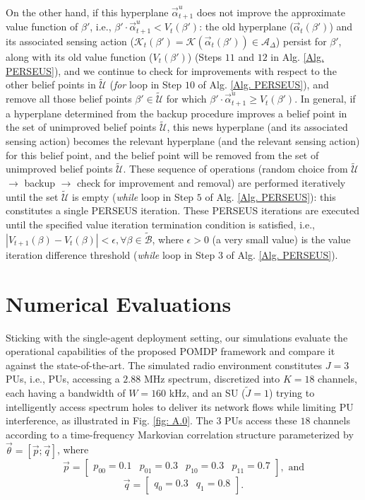 \documentclass[10pt, twocolumn]{IEEEtran}
\begin{document}
On the other hand, if this hyperplane $\vec{\alpha}_{t+1}^{u}$ does not improve the approximate value function of $\beta'$, i.e., $\beta'{\cdot}\vec{\alpha}_{t+1}^{u}{<}V_{t}(\beta')$: the old hyperplane ($\vec{\alpha}_{t}(\beta')$) and its associated sensing action ($\mathcal{K}_{t}(\beta'){=}\mathcal{K}(\vec{\alpha}_{t}(\beta')){\in}\mathcal{A}_{\Delta}$) persist for $\beta'$, along with its old value function ($V_{t}(\beta')$) (Steps $11$ and $12$ in Alg. \ref{Alg. PERSEUS}), and we continue to check for improvements with respect to the other belief points in $\tilde{\mathcal{U}}$ (\emph{for} loop in Step $10$ of Alg. \ref{Alg. PERSEUS}), and remove all those belief points $\beta'{\in}\tilde{\mathcal{U}}$ for which $\beta'{\cdot}\vec{\alpha}_{t+1}^{u}{\geq}V_{t}(\beta')$. In general, if a hyperplane determined from the backup procedure improves a belief point in the set of unimproved belief points $\tilde{\mathcal{U}}$, this news hyperplane (and its associated sensing action) becomes the relevant hyperplane (and the relevant sensing action) for this belief point, and the belief point will be removed from the set of unimproved belief points $\tilde{\mathcal{U}}$. These sequence of operations (random choice from $\tilde{\mathcal{U}}$ ${\longrightarrow}$ backup ${\longrightarrow}$ check for improvement and removal) are performed iteratively until the set $\tilde{\mathcal{U}}$ is empty (\emph{while} loop in Step $5$ of Alg. \ref{Alg. PERSEUS}): this constitutes a single PERSEUS iteration. These PERSEUS iterations are executed until the specified value iteration termination condition is satisfied, i.e., $|V_{t+1}(\beta)-V_{t}(\beta)|{<}\epsilon,{\forall}\beta{\in}\tilde{\mathcal{B}}$, where $\epsilon{>}0$ (a very small value) is the value iteration difference threshold (\emph{while} loop in Step $3$ of Alg. \ref{Alg. PERSEUS}).
\vspace{-5mm}

\section{Numerical Evaluations}\label{III}
Sticking with the single-agent deployment setting, our simulations evaluate the operational capabilities of the proposed POMDP framework and compare it against the state-of-the-art. The simulated radio environment constitutes $J{=}3$ PUs, i.e., PUs, accessing a $2.88$ MHz spectrum, discretized into $K{=}18$ channels, each having a bandwidth of $W{=}160$ kHz, and an SU ($\tilde{J}{=}1$) trying to intelligently access spectrum holes to deliver its network flows while limiting PU interference, as illustrated in Fig. \ref{fig: A.0}. The $3$ PUs access these $18$ channels according to a time-frequency Markovian correlation structure parameterized by
$\vec{\theta}=[\vec{p}; \vec{q}]$, where
\[\vec{p}=\begin{bmatrix}
            p_{00}{=}0.1 & p_{01}{=}0.3 & p_{10}{=}0.3 & p_{11}{=}0.7
          \end{bmatrix},\text{ and}\]
\[\vec{q}=\begin{bmatrix}
            q_{0}{=}0.3 & q_{1}{=}0.8
          \end{bmatrix}.\]
\end{document}
